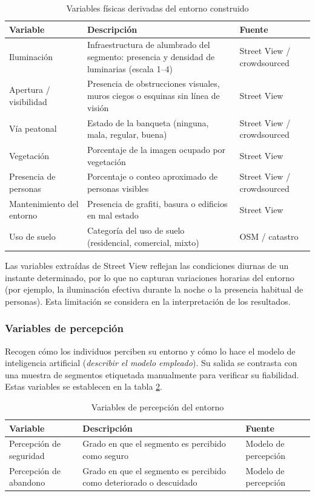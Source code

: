\begin{table}[htbp]
\centering
\caption{Variables físicas derivadas del entorno construido}
\label{tab:variables-fisicas}
\begin{tabular}{|p{3cm}|p{6cm}|p{3cm}|}
\hline
\textbf{Variable} & \textbf{Descripción} & \textbf{Fuente} \\ \hline
Iluminación & Infraestructura de alumbrado del segmento: presencia y densidad de luminarias (escala 1--4) & Street View / crowdsourced \\ \hline
Apertura / visibilidad & Presencia de obstrucciones visuales, muros ciegos o esquinas sin línea de visión & Street View \\ \hline
Vía peatonal & Estado de la banqueta (ninguna, mala, regular, buena) & Street View / crowdsourced \\ \hline
Vegetación & Porcentaje de la imagen ocupado por vegetación & Street View \\ \hline
Presencia de personas & Porcentaje o conteo aproximado de personas visibles & Street View / crowdsourced \\ \hline
Mantenimiento del entorno & Presencia de grafiti, basura o edificios en mal estado & Street View \\ \hline
Uso de suelo & Categoría del uso de suelo (residencial, comercial, mixto) & OSM / catastro \\ \hline
\end{tabular}
\end{table}

Las variables extraídas de Street View reflejan las condiciones diurnas de un instante determinado, por lo que no capturan variaciones horarias del entorno (por ejemplo, la iluminación efectiva durante la noche o la presencia habitual de personas). Esta limitación se considera en la interpretación de los resultados.

\subsubsection{Variables de percepción}
Recogen cómo los individuos perciben su entorno y cómo lo hace el modelo de inteligencia artificial (\textit{describir el modelo empleado}). Su salida se contrasta con una muestra de segmentos etiquetada manualmente para verificar su fiabilidad. Estas variables se establecen en la tabla \ref{tab:variables-percepcion}.

\begin{table}[htbp]
\centering
\caption{Variables de percepción del entorno}
\label{tab:variables-percepcion}
\begin{tabular}{|p{3cm}|p{6cm}|p{3cm}|}
\hline
\textbf{Variable} & \textbf{Descripción} & \textbf{Fuente} \\ \hline
Percepción de seguridad & Grado en que el segmento es percibido como seguro & Modelo de percepción \\ \hline
Percepción de abandono & Grado en que el segmento es percibido como deteriorado o descuidado & Modelo de percepción \\ \hline
\end{tabular}
\end{table}

